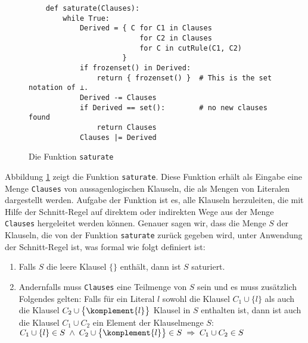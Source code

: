 \begin{figure}[!ht]
\centering
\begin{verbatim}
    def saturate(Clauses):
        while True:
            Derived = { C for C1 in Clauses
                          for C2 in Clauses
                          for C in cutRule(C1, C2)
                      }
            if frozenset() in Derived:
                return { frozenset() }  # This is the set notation of ⊥.
            Derived -= Clauses
            if Derived == set():        # no new clauses found
                return Clauses
            Clauses |= Derived
\end{verbatim}
\vspace*{-0.3cm}
\caption{Die Funktion \texttt{saturate}}
\label{fig:Completeness.ipynb-2}
\end{figure}
    
Abbildung \ref{fig:Completeness.ipynb-2} zeigt die Funktion \texttt{saturate}.  Diese Funktion erhält
als Eingabe eine Menge \texttt{Clauses} von aus\-sagenlogischen Klauseln, die als Mengen von Literalen
dargestellt werden.  Aufgabe der Funktion ist es, alle Klauseln herzuleiten, die mit Hilfe der
Schnitt-Regel auf direktem oder indirekten Wege aus der Menge \texttt{Clauses} hergeleitet werden
können.  Genauer sagen wir, dass die Menge $S$ der Klauseln, die von der Funktion \texttt{saturate}
zurück gegeben wird, unter Anwendung der Schnitt-Regel  ist, was formal wie folgt
definiert ist:
\begin{enumerate}
\item Falls $S$ die leere Klausel $\{\}$ enthält, dann ist $S$ saturiert.
\item Andernfalls muss \texttt{Clauses} eine Teilmenge von $S$ sein und es muss zusätzlich Folgendes
      gelten: Falls für ein Literal $l$ sowohl die Klausel $C_1 \cup \{ l \}$ als auch die Klausel $C_2 \cup
      \bigl\{ \komplement{l} \bigr\}$ Klausel in $S$
      enthalten ist, dann ist auch die Klausel $C_1 \cup C_2$ ein Element der Klausel\-menge $S$:
      \\[0.2cm]
      \hspace*{1.3cm}
      $C_1 \cup \{ l \} \in S \;\wedge\; C_2 \cup \bigl\{ \komplement{l} \bigr\} \in S \;\Rightarrow\; C_1 \cup C_2 \in S$ 
\end{enumerate}

